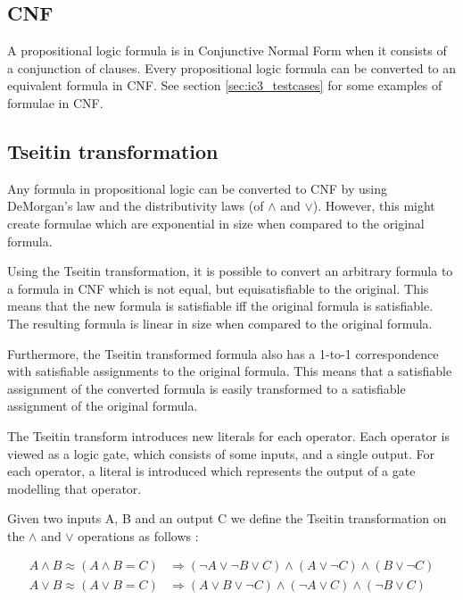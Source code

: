 \documentclass[a4paper]{article}
\begin{document}
\subsection{CNF}
A propositional logic formula is in Conjunctive Normal Form when it consists of a conjunction of clauses. Every propositional logic formula can be converted to an equivalent formula in CNF. See section \ref{sec:ic3_testcases} for some examples of formulae in CNF.

\subsection{Tseitin transformation}
Any formula in propositional logic can be converted to CNF by using DeMorgan's law and the distributivity laws (of $\land$ and $\lor$). However, this might create formulae which are exponential in size when compared to the original formula.

Using the Tseitin transformation, it is possible to convert an arbitrary formula to a formula in CNF which is not equal, but equisatisfiable to the original. This means that the new formula is satisfiable iff the original formula is satisfiable. The resulting formula is linear in size when compared to the original formula.

Furthermore, the Tseitin transformed formula also has a 1-to-1 correspondence with satisfiable assignments to the original formula. This means that a satisfiable assignment of the converted formula is easily transformed to a satisfiable assignment of the original formula.

The Tseitin transform introduces new literals for each operator. Each operator is viewed as a logic gate, which consists of some inputs, and a single output. For each operator, a literal is introduced which represents the output of a gate modelling that operator.

Given two inputs A, B and an output C we define the Tseitin transformation on the $\land$ and $\lor$ operations as follows \cite{Wikipedia2015}:

\begin{align*}
A \land B \approx (A \land B = C) &\Rightarrow (\lnot A \lor \lnot B \lor C) \land (A \lor \lnot C) \land (B \lor \lnot C)\\
A \lor B \approx (A \lor B = C) &\Rightarrow (A \lor B \lor \lnot C) \land (\lnot A \lor  C) \land (\lnot B \lor   C)\\
\end{align*}
\end{document}
